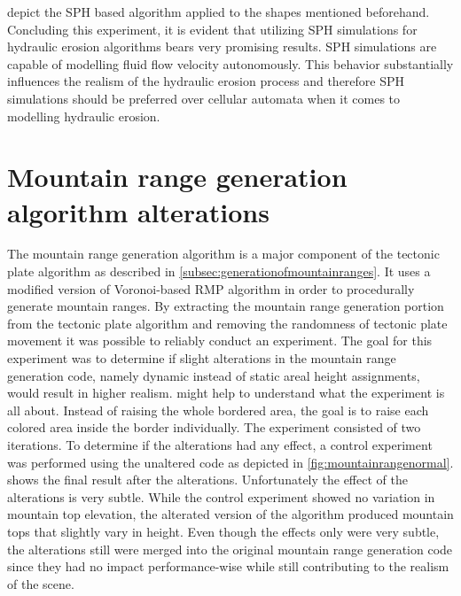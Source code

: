 \documentclass[11pt,a4paper,twoside,openright]{report}
\begin{document}
 depict the SPH based algorithm applied to the shapes mentioned beforehand. Concluding this experiment, it is evident that utilizing SPH simulations for hydraulic erosion algorithms bears very promising results. SPH simulations are capable of modelling fluid flow velocity autonomously. This behavior substantially influences the realism of the hydraulic erosion process and therefore SPH simulations should be preferred over cellular automata when it comes to modelling hydraulic erosion.

\section{Mountain range generation algorithm alterations}
The mountain range generation algorithm is a major component of the tectonic plate algorithm as described in \cref{subsec:generationofmountainranges}. It uses a modified version of Voronoi-based RMP algorithm in order to procedurally generate mountain ranges. By extracting the mountain range generation portion from the tectonic plate algorithm and removing the randomness of tectonic plate movement it was possible to reliably conduct an experiment. The goal for this experiment was to determine if slight alterations in the mountain range generation code, namely dynamic instead of static areal height assignments, would result in higher realism.  might help to understand what the experiment is all about. Instead of raising the whole bordered area, the goal is to raise each colored area inside the border individually. The experiment consisted of two iterations. To determine if the alterations had any effect, a control experiment was performed using the unaltered code as depicted in \cref{fig:mountainrangenormal}.  shows the final result after the alterations. Unfortunately the effect of the alterations is very subtle. While the control experiment showed no variation in mountain top elevation, the alterated version of the algorithm produced mountain tops that slightly vary in height. Even though the effects only were very subtle, the alterations still were merged into the original mountain range generation code since they had no impact performance-wise while still contributing to the realism of the scene.
\end{document}

